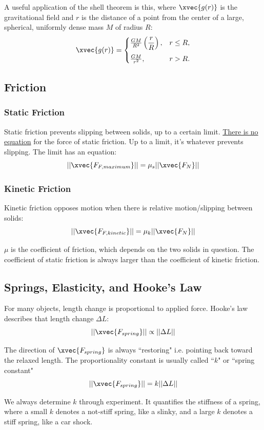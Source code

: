 \documentclass{article}
\begin{document}
A useful application of the shell theorem is this, where $\xvec{g(r)}$ is the gravitational field and $ r $ is the distance of a point from the center of a large, spherical, uniformly dense mass $ M $ of radius $ R $:
$$
\xvec{g(r)} =
\begin{cases}
\frac{GM}{R^2}\left(\dfrac{r}{R}\right), & r \leq R, \\[8pt]
\frac{GM}{r^2}, & r > R.
\end{cases}
$$

\subsection {Friction}
\subsubsection{Static Friction}
Static friction prevents slipping between solids, up to a certain limit. \uline{There is no equation} for the force of static friction. Up to a limit, it's whatever prevents slipping. The limit has an
equation:
$$ ||\xvec{F_{F,maximum}}|| = \mu_s||\xvec{F_N}|| $$

\subsubsection{Kinetic Friction}
Kinetic friction opposes motion when there is relative motion/slipping between solids:
$$ ||\xvec{F_{F,kinetic}}|| = \mu_k||\xvec{F_N}|| $$

$ \mu $ is the coefficient of friction, which depends on the two solids in question. The coefficient of static friction is always larger than the coefficient of kinetic friction.

\subsection {Springs, Elasticity, and Hooke's Law}
For many objects, length change is proportional to applied force.
Hooke's law describes that length change $ \Delta L $:
$$ ||\xvec{F_{spring}}|| \propto ||\Delta L|| $$

The direction of $\xvec{F_{spring}}$ is always ``restoring" i.e. pointing back toward the relaxed length.
The proportionality constant is usually called ``$k$" or ``spring constant"
$$ ||\xvec{F_{spring}}|| = k||\Delta L|| $$

We always determine $k$ through experiment. It quantifies the stiffness of a spring, where a small $k$ denotes a not-stiff spring, like a slinky, and a large $k$ denotes a stiff spring, like a car shock.
\end{document}
